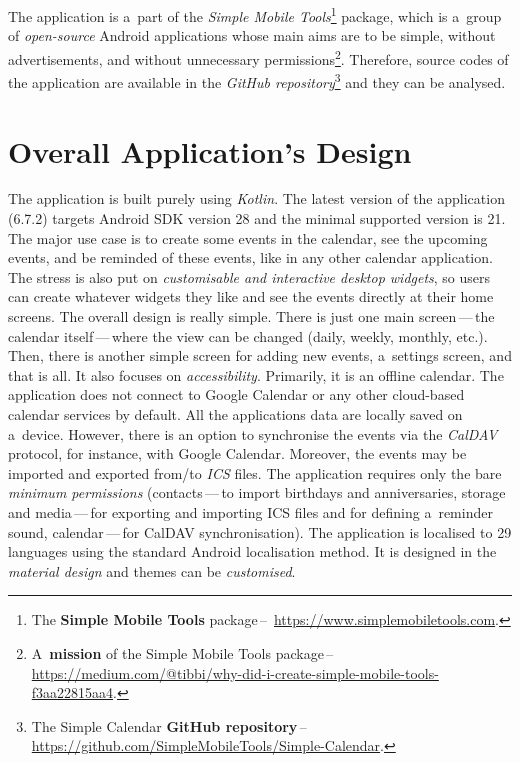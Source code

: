\documentclass[a4paper, 11pt]{article}
\begin{document}
	The application is a~part of the \emph{Simple Mobile Tools}\footnote{%
		The \textbf{Simple Mobile Tools} package\,--\,%
		\url{https://www.simplemobiletools.com}.
	} package, which is a~group of \emph{open-source} Android applications
	whose main aims are to be simple, without advertisements, and without
	unnecessary permissions\footnote{%
		A~\textbf{mission} of the Simple Mobile Tools package\,--\,%
		\url{https://medium.com/@tibbi/why-did-i-create-simple-mobile-tools-f3aa22815aa4}.
	}. Therefore, source codes of the application are available in the \emph{%
	GitHub repository}\footnote{%
		The Simple Calendar \textbf{GitHub repository}\,--\,%
		\url{https://github.com/SimpleMobileTools/Simple-Calendar}.
	} and they can be analysed.


	\section{Overall Application's Design}
	\label{sec:design}

	The application is built purely using \emph{Kotlin}. The latest version of
	the application (6.7.2) targets Android SDK version 28 and the
	minimal supported version is 21. The major use case is to create some
	events in the calendar, see the upcoming events, and be reminded of
	these events, like in any other calendar application. The stress is
	also put on \emph{customisable and interactive desktop widgets}, so users
	can create whatever widgets they like and see the events directly
	at their home screens. The overall design is really simple. There is just
	one main screen\,---\,the calendar itself\,---\,where the view can be
	changed (daily, weekly, monthly, etc.). Then, there is another simple
	screen for adding new events, a~settings screen, and that is all. It also
	focuses on \emph{accessibility}. Primarily, it is an offline calendar.
	The application does not connect to Google Calendar or any other
	cloud-based calendar services by default. All the applications data are
	locally saved on a~device. However, there is an option to synchronise
	the events via the \emph{CalDAV} protocol, for instance, with Google
	Calendar. Moreover, the events may be imported and exported from/to
	\emph{ICS} files. The application requires only the bare \emph{minimum
	permissions} (contacts\,---\,to import birthdays and anniversaries,
	storage and media\,---\,for exporting and importing ICS files and
	for defining a~reminder sound, calendar\,---\,for CalDAV synchronisation).
	The application is localised to 29 languages using the standard Android
	localisation method. It is designed in the \emph{material design} and
	themes can be \emph{customised}.
\end{document}
